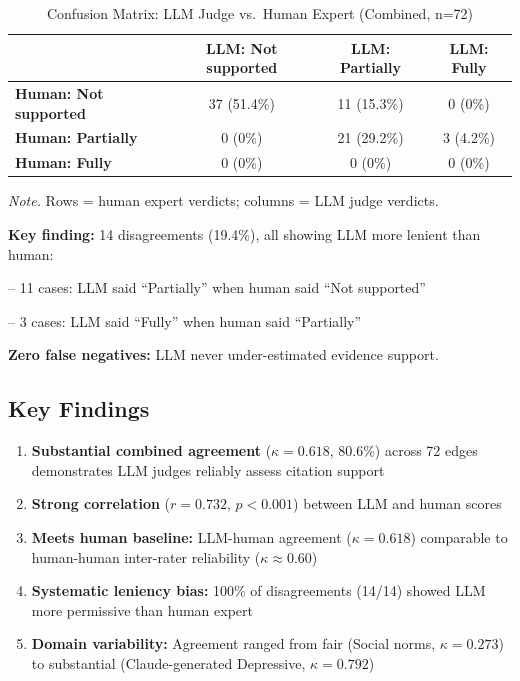 \documentclass{article}
\begin{document}
\begin{table}[H]
\centering
\caption{Confusion Matrix: LLM Judge vs.\ Human Expert (Combined, n=72)}
\label{tab:human_validation_confusion}
\begin{threeparttable}
\begin{tabular}{lccc}
\toprule
 & \textbf{LLM: Not supported} & \textbf{LLM: Partially} & \textbf{LLM: Fully} \\
\midrule
\textbf{Human: Not supported} & 37 (51.4\%) & 11 (15.3\%) & 0 (0\%) \\
\textbf{Human: Partially} & 0 (0\%) & 21 (29.2\%) & 3 (4.2\%) \\
\textbf{Human: Fully} & 0 (0\%) & 0 (0\%) & 0 (0\%) \\
\bottomrule
\end{tabular}
\begin{tablenotes}
\small
\item \textit{Note.} Rows = human expert verdicts; columns = LLM judge verdicts.
\item \textbf{Key finding:} 14 disagreements (19.4\%), all showing LLM more lenient than human:
\item \quad -- 11 cases: LLM said ``Partially'' when human said ``Not supported''
\item \quad -- 3 cases: LLM said ``Fully'' when human said ``Partially''
\item \textbf{Zero false negatives:} LLM never under-estimated evidence support.
\end{tablenotes}
\end{threeparttable}
\end{table}

\subsection{Key Findings}

\begin{enumerate}[noitemsep]
    \item \textbf{Substantial combined agreement} ($\kappa=0.618$, 80.6\%) across 72 edges demonstrates LLM judges reliably assess citation support
    \item \textbf{Strong correlation} ($r=0.732$, $p<0.001$) between LLM and human scores
    \item \textbf{Meets human baseline:} LLM-human agreement ($\kappa=0.618$) comparable to human-human inter-rater reliability ($\kappa \approx 0.60$)
    \item \textbf{Systematic leniency bias:} 100\% of disagreements (14/14) showed LLM more permissive than human expert
    \item \textbf{Domain variability:} Agreement ranged from fair (Social norms, $\kappa=0.273$) to substantial (Claude-generated Depressive, $\kappa=0.792$)
\end{enumerate}
\end{document}
